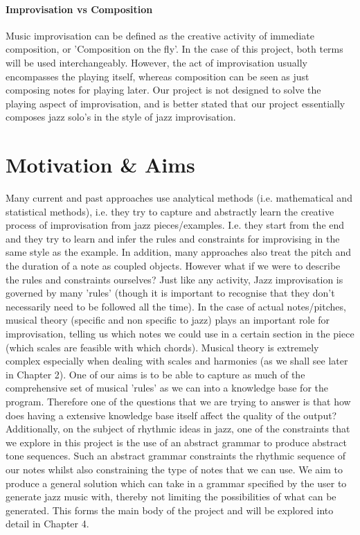 \documentclass[pdftex,12pt,a4paper]{report}
\begin{document}
\paragraph{Improvisation vs Composition}
Music improvisation can be defined as the creative activity of immediate composition, or 'Composition on the fly'. In the case of this project, both terms will be used interchangeably. However, the act of improvisation usually encompasses the playing itself, whereas composition can be seen as just composing notes for playing later. Our project is not designed to solve the playing aspect of improvisation, and is better stated that our project essentially composes jazz solo's in the style of jazz improvisation.

\section{Motivation \& Aims}
Many current and past approaches use analytical methods (i.e. mathematical and statistical methods), i.e. they try to capture and abstractly learn the creative process of improvisation from jazz pieces/examples. I.e. they start from the end and they try to learn and infer the rules and constraints for improvising in the same style as the example. In addition, many approaches also treat the pitch and the duration of a note as coupled objects. 
However what if we were to describe the rules and constraints ourselves? Just like any activity, Jazz improvisation is governed by many 'rules' (though it is important to recognise that they don't necessarily need to be followed all the time). In the case of actual notes/pitches, musical theory (specific and non specific to jazz) plays an important role for improvisation, telling us which notes we could use in a certain section in the piece (which scales are feasible with which chords). Musical theory is extremely complex especially when dealing with scales and harmonies (as we shall see later in Chapter 2). One of our aims is to be able to capture as much of the comprehensive set of musical 'rules' as we can into a knowledge base for the program. Therefore one of the questions that we are trying to answer is that how does having a extensive knowledge base itself affect the quality of the output? Additionally, on the subject of rhythmic ideas in jazz, one of the constraints that we explore in this project is the use of an abstract grammar to produce abstract tone sequences. Such an abstract grammar constraints the rhythmic sequence of our notes whilst also constraining the type of notes that we can use. We aim to produce a general solution which can take in a grammar specified by the user to generate jazz music with, thereby not limiting the possibilities of what can be generated. This forms the main body of the project and will be explored into detail in Chapter 4.
\end{document}
